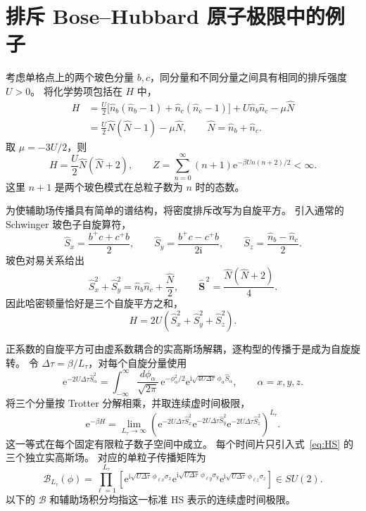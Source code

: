\documentclass[UTF8,11pt,a4paper,fontset=fandol]{ctexart}
\newcommand{\ee}{\mathrm e}
\newcommand{\ii}{\mathrm i}
\numberwithin{equation}{section}
\begin{document}
\section{排斥 Bose--Hubbard 原子极限中的例子}

考虑单格点上的两个玻色分量 $b,c$，同分量和不同分量之间具有相同的排斥强度 $U>0$。
将化学势项包括在 $H$ 中，
\begin{align}
 H&=\frac U2\bigl[\hat n_b(\hat n_b-1)+\hat n_c(\hat n_c-1)\bigr]
      +U\hat n_b\hat n_c-\mu\hat N \nonumber\\
  &=\frac U2\hat N(\hat N-1)-\mu\hat N,\qquad
 \hat N=\hat n_b+\hat n_c.
 \label{eq:model}
\end{align}
取 $\mu=-3U/2$，则
\begin{equation}
 H=\frac U2\hat N(\hat N+2),\qquad
 Z=\sum_{n=0}^{\infty}(n+1)\ee^{-\beta U n(n+2)/2}<\infty.
 \label{eq:physicalZ}
\end{equation}
这里 $n+1$ 是两个玻色模式在总粒子数为 $n$ 时的态数。

为使辅助场传播具有简单的谱结构，将密度排斥改写为自旋平方。
引入通常的 Schwinger 玻色子自旋算符，
\begin{equation}
 \hat S_x=\frac{b^+c+c^+b}{2},\qquad
 \hat S_y=\frac{b^+c-c^+b}{2\ii},\qquad
 \hat S_z=\frac{\hat n_b-\hat n_c}{2}.
\end{equation}
玻色对易关系给出
\begin{equation}
 \hat S_x^2+\hat S_y^2=\hat n_b\hat n_c+\frac{\hat N}{2},
 \qquad
 \hat{\boldsymbol S}^{\,2}=\frac{\hat N(\hat N+2)}4.
\end{equation}
因此哈密顿量恰好是三个自旋平方之和，
\begin{equation}
 H=2U(\hat S_x^2+\hat S_y^2+\hat S_z^2).
 \label{eq:spinsquare}
\end{equation}

正系数的自旋平方可由虚系数耦合的实高斯场解耦，逐构型的传播于是成为自旋旋转。
令 $\Delta\tau=\beta/L_\tau$，对每个自旋分量使用
\begin{equation}
 \ee^{-2U\Delta\tau\hat S_\alpha^2}
 =\int_{-\infty}^{\infty}\frac{d\phi_\alpha}{\sqrt{2\pi}}\,
    \ee^{-\phi_\alpha^2/2}
    \ee^{\ii\sqrt{4U\Delta\tau}\,\phi_\alpha\hat S_\alpha},
 \qquad \alpha=x,y,z.
 \label{eq:HS}
\end{equation}
将三个分量按 Trotter 分解相乘，并取连续虚时间极限，
\begin{equation}
 \ee^{-\beta H}
 =\lim_{L_\tau\to\infty}
 \left(\ee^{-2U\Delta\tau\hat S_x^2}
       \ee^{-2U\Delta\tau\hat S_y^2}
       \ee^{-2U\Delta\tau\hat S_z^2}\right)^{L_\tau}.
\end{equation}
这一等式在每个固定有限粒子数子空间中成立。
每个时间片只引入式~\eqref{eq:HS} 的三个独立实高斯场。
对应的单粒子传播矩阵为
\begin{equation}
 \mathcal B_{L_\tau}(\phi)
 =\prod_{\ell=1}^{L_\tau}
 \left[
 \ee^{\ii\sqrt{U\Delta\tau}\,\phi_{\ell x}\sigma_x}
 \ee^{\ii\sqrt{U\Delta\tau}\,\phi_{\ell y}\sigma_y}
 \ee^{\ii\sqrt{U\Delta\tau}\,\phi_{\ell z}\sigma_z}
 \right]\in SU(2).
 \label{eq:spinB}
\end{equation}
以下的 $\mathcal B$ 和辅助场积分均指这一标准 HS 表示的连续虚时间极限。
\end{document}
